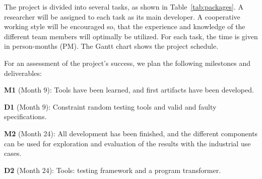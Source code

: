 \documentclass[fleqn,12pt]{article}
\begin{document}
%
%
%


The project is divided into several tasks, as shown in  Table~\ref{tab:packages}.
A researcher will be assigned to each task as its main developer.
A cooperative
working style will be encouraged so, that the experience and
knowledge of the different team members will optimally be utilized.
For each task, the time is given in person-months (PM). The Gantt chart shows
the project schedule.


For an assessment of the project's success, we plan the following milestones and deliverables:

\textbf{M1} (Month 9): Tools have been learned, and first artifacts have been developed.

\textbf{D1} (Month 9): Constraint random testing tools and valid and faulty specifications.


\textbf{M2} (Month 24): All development has been finished, and the different components
can be used for exploration and evaluation of the results with the industrial use cases.

\textbf{D2} (Month 24): Tools: testing framework and a program transformer.
\end{document}
